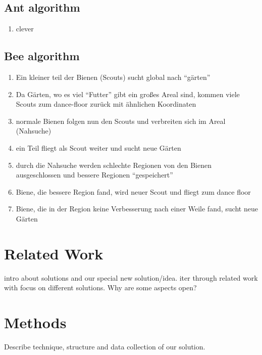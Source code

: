 \subsection{Ant algorithm}\label{ant-algorithm}

\begin{enumerate}
\def\labelenumi{\arabic{enumi}.}
\tightlist
\item
  clever
\end{enumerate}

\subsection{Bee algorithm}\label{bee-algorithm}

\begin{enumerate}
\def\labelenumi{\arabic{enumi}.}
\tightlist
\item
  Ein kleiner teil der Bienen (Scouts) sucht global nach ``gärten''
\item
  Da Gärten, wo es viel ``Futter'' gibt ein großes Areal sind, kommen
  viele Scouts zum dance-floor zurück mit ähnlichen Koordinaten
\item
  normale Bienen folgen nun den Scouts und verbreiten sich im Areal
  (Nahsuche)
\item
  ein Teil fliegt als Scout weiter und sucht neue Gärten
\item
  durch die Nahsuche werden schlechte Regionen von den Bienen
  ausgeschlossen und bessere Regionen ``gespeichert''
\item
  Biene, die bessere Region fand, wird neuer Scout und fliegt zum dance
  floor
\item
  Biene, die in der Region keine Verbesserung nach einer Weile fand,
  sucht neue Gärten
\end{enumerate}

\section{Related Work}\label{related-work}

intro about solutions and our special new solution/idea. iter through
related work with focus on different solutions. Why are some aspects
open?

\section{Methods}\label{methods}

Describe technique, structure and data collection of our solution.

